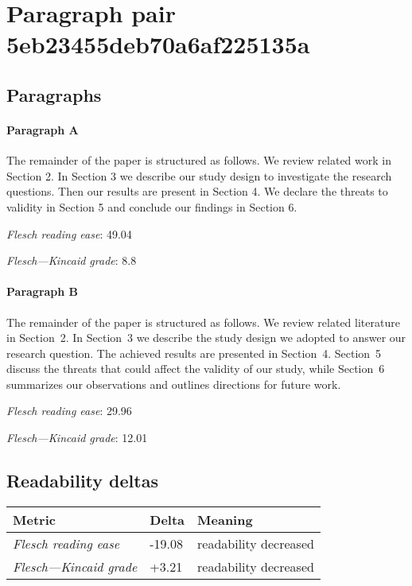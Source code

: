 \section{Paragraph pair 5eb23455deb70a6af225135a}
\subsection{Paragraphs}
\paragraph{Paragraph A}
The remainder of the paper is structured as follows. We review related work in Section 2. In Section 3 we describe our study design to investigate the research questions. Then our results are present in Section 4. We declare the threats to validity in Section 5 and conclude our findings in Section 6.\par\medskip
\emph{Flesch reading ease}: 49.04\par
\emph{Flesch---Kincaid grade}: 8.8

\paragraph{Paragraph B}
The remainder of the paper is structured as follows. We review related literature in Section 2. In Section 3 we describe the study design we adopted to answer our research question. The achieved results are presented in Section 4. Section 5 discuss the threats that could affect the validity of our study, while Section 6 summarizes our observations and outlines directions for future work.\par\medskip
\emph{Flesch reading ease}: 29.96\par
\emph{Flesch---Kincaid grade}: 12.01

\subsection{Readability deltas}

\begin{tabular}{lll}
\toprule
               \textbf{Metric} & \textbf{Delta} &       \textbf{Meaning} \\
\midrule
    \emph{Flesch reading ease} &         -19.08 &  readability decreased \\
 \emph{Flesch---Kincaid grade} &          +3.21 &  readability decreased \\
\bottomrule
\end{tabular}

